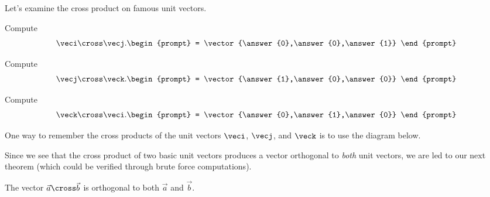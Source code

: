 \documentclass{ximera}
\begin{document}
Let's examine the cross product on famous unit vectors.
\begin{question}
  Compute
  \[
  \veci \cross \vecj.
  \begin{prompt}
    = \vector{\answer{0},\answer{0},\answer{1}}
  \end{prompt}
  \]
  \begin{question}
  Compute
  \[
  \vecj\cross\veck. 
  \begin{prompt}
    = \vector{\answer{1},\answer{0},\answer{0}}
  \end{prompt}
  \]
  \begin{question}
  Compute
  \[
  \veck\cross\veci. 
  \begin{prompt}
    = \vector{\answer{0},\answer{1},\answer{0}}
  \end{prompt}
  \]
\end{question}
\end{question}
\end{question}

One way to remember the cross products of the unit vectors $\veci$, $\vecj$, and $\veck$ is to use the diagram below.
\begin{image}[1in]
\end{image}

Since we see that the cross product of two basic unit vectors produces
a vector orthogonal to \textit{both} unit vectors, we are led to our
next theorem (which could be verified through brute force
computations).

\begin{theorem}
  The vector $\vec{a}\cross\vec{b}$ is orthogonal to both $\vec{a}$
  and $\vec{b}$.
\end{theorem}
\end{document}
